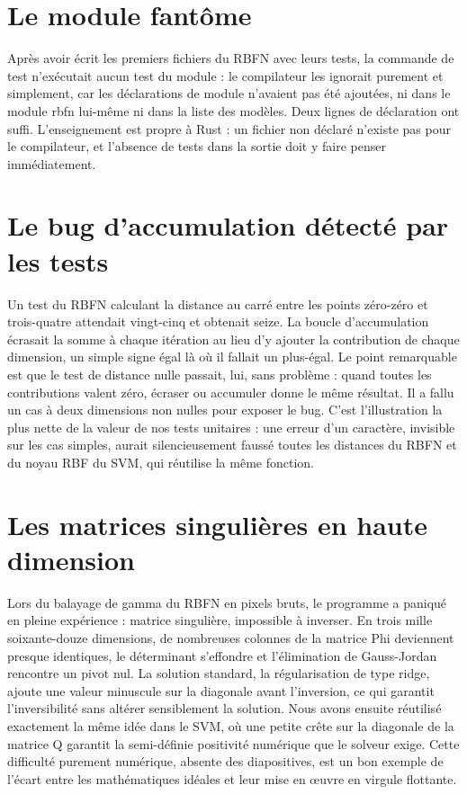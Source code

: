 \documentclass[11pt,a4paper]{report}
\begin{document}
\hypertarget{le-module-fantuxf4me}{%
\section{Le module fantôme}\label{le-module-fantuxf4me}}

Après avoir écrit les premiers fichiers du RBFN avec leurs tests, la
commande de test n'exécutait aucun test du module : le compilateur les
ignorait purement et simplement, car les déclarations de module
n'avaient pas été ajoutées, ni dans le module rbfn lui-même ni dans la
liste des modèles. Deux lignes de déclaration ont suffi. L'enseignement
est propre à Rust : un fichier non déclaré n'existe pas pour le
compilateur, et l'absence de tests dans la sortie doit y faire penser
immédiatement.

\hypertarget{le-bug-daccumulation-duxe9tectuxe9-par-les-tests}{%
\section{Le bug d'accumulation détecté par les
tests}\label{le-bug-daccumulation-duxe9tectuxe9-par-les-tests}}

Un test du RBFN calculant la distance au carré entre les points
zéro-zéro et trois-quatre attendait vingt-cinq et obtenait seize. La
boucle d'accumulation écrasait la somme à chaque itération au lieu d'y
ajouter la contribution de chaque dimension, un simple signe égal là où
il fallait un plus-égal. Le point remarquable est que le test de
distance nulle passait, lui, sans problème : quand toutes les
contributions valent zéro, écraser ou accumuler donne le même résultat.
Il a fallu un cas à deux dimensions non nulles pour exposer le bug.
C'est l'illustration la plus nette de la valeur de nos tests unitaires :
une erreur d'un caractère, invisible sur les cas simples, aurait
silencieusement faussé toutes les distances du RBFN et du noyau RBF du
SVM, qui réutilise la même fonction.

\hypertarget{les-matrices-singuliuxe8res-en-haute-dimension}{%
\section{Les matrices singulières en haute
dimension}\label{les-matrices-singuliuxe8res-en-haute-dimension}}

Lors du balayage de gamma du RBFN en pixels bruts, le programme a
paniqué en pleine expérience : matrice singulière, impossible à
inverser. En trois mille soixante-douze dimensions, de nombreuses
colonnes de la matrice Phi deviennent presque identiques, le déterminant
s'effondre et l'élimination de Gauss-Jordan rencontre un pivot nul. La
solution standard, la régularisation de type ridge, ajoute une valeur
minuscule sur la diagonale avant l'inversion, ce qui garantit
l'inversibilité sans altérer sensiblement la solution. Nous avons
ensuite réutilisé exactement la même idée dans le SVM, où une petite
crête sur la diagonale de la matrice Q garantit la semi-définie
positivité numérique que le solveur exige. Cette difficulté purement
numérique, absente des diapositives, est un bon exemple de l'écart entre
les mathématiques idéales et leur mise en œuvre en virgule flottante.
\end{document}
